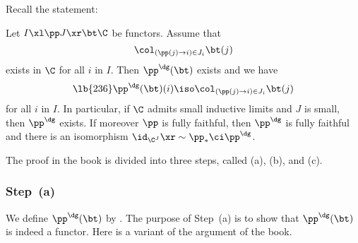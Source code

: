 \documentclass[12pt]{article}
\theoremstyle{remark}
\theoremstyle{definition}
\begin{document}


Recall the statement: 

\begin{thm}[Theorem 2.3.3 (i) p.~52]
Let $I\xl\pp J\xr\bt\C$ be functors. Assume that 
$$
\col_{(\pp(j)\to i)\in J_i}\bt(j)
$$ 
exists in $\C$ for all $i$ in $I$. Then $\pp^\dg(\bt)$ exists and we have 
%
\begin{equation}\lb{236}
\pp^\dg(\bt)(i)\iso\col_{(\pp(j)\to i)\in J_i}\bt(j)
\end{equation} 
%
for all $i$ in $I$. In particular, if $\C$ admits small inductive limits and $J$ is small, then $\pp^\dg$ exists. If moreover $\pp$ is fully faithful, then $\pp^\dg$ is fully faithful and there is an isomorphism $\id_{\C^J}\xr\sim\pp_*\ci\pp^\dg$. 
\end{thm}
The proof in the book is divided into three steps, called (a), (b), and (c). 

%

\subsubsection{Step~(a)}

We define $\pp^\dg(\bt)$ by . The purpose of Step~(a) is to show that $\pp^\dg(\bt)$ is indeed a functor. Here is a variant of the argument of the book. %
\end{document}
